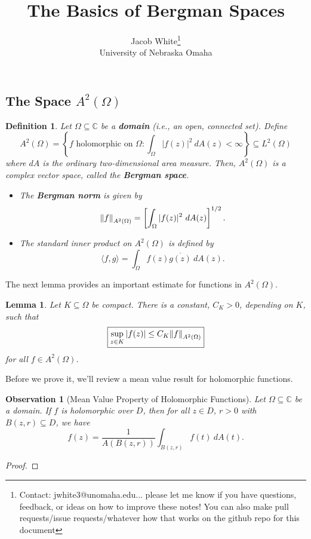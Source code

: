 \documentclass[10pt]{article}
\title{\textbf{The Basics of Bergman Spaces}}
\date{}
\author{Jacob White\footnote{Contact: jwhite3@unomaha.edu... please let me know if you have questions, feedback, or ideas on how to improve these notes! You can also make pull requests/issue requests/whatever how that works on the github repo for this document} \\ University of Nebraska Omaha}
\theoremstyle{plain}
\newtheorem{definition}{Definition}
\newtheorem{lemma}{Lemma}
\newtheorem{observation}{Observation}
\begin{document}
	\maketitle 
	

\subsection*{The Space $A^2(\Omega)$}

	\begin{definition}
		Let $\Omega \subseteq \mathbb{C}$ be a \textbf{\textit{domain}} (i.e., an open, connected set). Define $$A^2(\Omega) = \left\{f \text{ holomorphic on } \Omega: \int_\Omega |f(z)|^2 \ dA(z) < \infty\right\} \subseteq L^2(\Omega)$$ where $dA$ is the ordinary two-dimensional area measure. Then, $A^2(\Omega)$ is a complex vector space, called the \textbf{\textit{Bergman space}}. 
			\begin{itemize}
				\item The \textbf{\textit{Bergman norm}} is given by $$\norm{f}_{A^2(\Omega)} = \left[\int_\Omega |f(z)|^2  \ dA(z)\right]^{1/2}.$$
				
				\item The standard inner product on $A^2(\Omega)$ is defined by $$\langle f, g \rangle = \int_\Omega f(z) \overline{g(z)} \ dA(z).$$
			\end{itemize} 
	\end{definition}
	
	The next lemma provides an important estimate for functions in $A^2(\Omega)$. 
	
	\begin{lemma}
		Let $K \subseteq \Omega$ be compact. There is a constant, $C_K > 0$, depending on $K$, such that $$\boxed{\sup_{z \in K} |f(z)| \leq C_K \norm{f}_{A^2(\Omega)}}$$ for all $f \in A^2(\Omega)$. 
	\end{lemma} 
	
	\noindent Before we prove it, we'll review a mean value result for holomorphic functions.
	
	\newpage 
	\begin{observation}[Mean Value Property of Holomorphic Functions]
		Let $\Omega \subseteq \mathbb{C}$ be a domain. If $f$ is holomorphic over $D$, then for all $z \in D$, $r > 0$ with $B(z, r) \subseteq D$, we have
			$$f(z) = \frac{1}{A(B(z, r))} \int_{B(z, r)} f(t) \ dA(t).$$
	\end{observation}
		\begin{proof}
			
		\end{proof}
\end{document}
